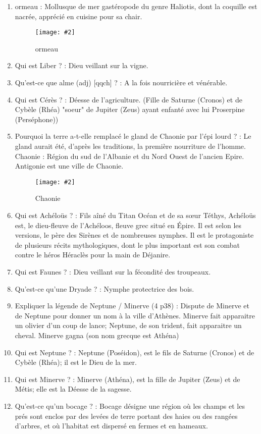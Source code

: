 \documentclass[a4paper, 11pt, hidelinks]{article}
\newcommand{\bs}{\bigskip}
\newcommand{\img}[4]{\begin{figure}[!ht]
    \centering
    \texttt{[image: \#2]}
    \caption{#3}
    \label{#4}
    \end{figure} }
\begin{document}
\begin{enumerate}
      \item ormeau : Mollusque de mer gastéropode du genre Haliotis, dont la coquille est nacrée, apprécié en cuisine pour sa chair.
            \img{0.5}{ormeau.jpg}{ormeau}{1}
      \item Qui est Liber ? : Dieu veillant sur la vigne.
      \item Qu'est-ce que alme (adj) [qqch] ? : A la fois nourricière et vénérable.
      \item Qui est Cérès ? : Déesse de l'agriculture. (Fille de Saturne (Cronos) et de Cybèle (Rhéa) "soeur" de Jupiter (Zeus) ayant enfanté avec lui
            Proserpine (Perséphone))
      \item Pourquoi la terre a-t-elle remplacé le gland de Chaonie par l'épi lourd ? : Le gland aurait été, d'après les
            traditions, la première nourriture de l'homme. Chaonie : Région du sud de l'Albanie et du Nord Ouest de l'ancien Epire. Antigonie est une ville de Chaonie.
            \img{0.5}{Chaonie.png}{Chaonie}{2}
      \item Qui est Achéloüs ? : Fils aîné du Titan Océan et de sa sœur Téthys, Achéloüs est, le dieu-fleuve de l'Achéloos, fleuve
            grec situé en Épire. Il est selon les versions, le père des Sirènes et de nombreuses nymphes. Il est le protagoniste
            de plusieurs récits mythologiques, dont le plus important est son combat contre le héros Héraclès pour la main de Déjanire.
      \item Qui est Faunes ? : Dieu veillant sur la fécondité des troupeaux.
      \item Qu'est-ce qu'une Dryade ? : Nymphe protectrice des bois. \bs \bs
      \item Expliquer la légende de Neptune / Minerve (4 p38) : Dispute de Minerve et de Neptune pour donner un nom à la ville
            d'Athènes. Minerve fait apparaitre un olivier d'un coup de lance; Neptune, de son trident, fait apparaitre un cheval.
            Minerve gagna (son nom grecque est Athéna)
      \item Qui est Neptune ? : Neptune (Poséidon), est le fils de Saturne (Cronos) et de Cybèle (Rhéa); il est le Dieu de la mer.
      \item Qui est Minerve ? : Minerve (Athéna), est la fille de Jupiter (Zeus) et de Métis; elle est la Déesse de la sagesse. \bs \bs
      \item Qu'est-ce qu'un bocage ? : Bocage désigne une région où les champs et les prés sont enclos par des levées de terre portant des haies ou des rangées d'arbres, et où l'habitat est dispersé en fermes et en hameaux.

\end{enumerate}
\end{document}
